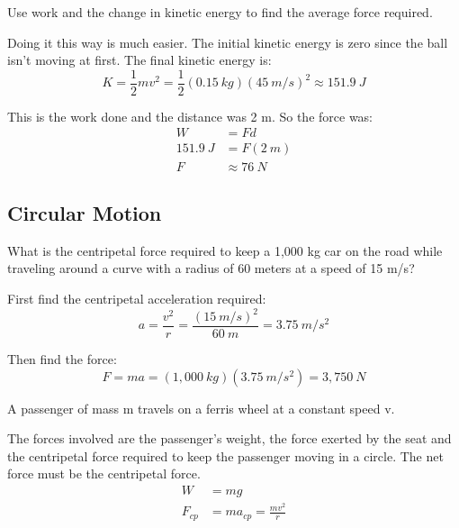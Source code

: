 \documentclass[fleqn,addpoints]{exam}
\begin{document}
\begin{questions}
\begin{parts}
\bonuspart[5]
Use work and the change in kinetic energy to find the average force required.
\begin{solution}
Doing it this way is much easier.  The initial kinetic energy is zero since the ball isn't moving at first.  The final
kinetic energy is:
\[
  K = \frac{1}{2} mv^2 = \frac{1}{2} (0.15 \ kg)(45 \ m/s)^2 \approx 151.9 \ J
\]

This is the work done and the distance was 2 m.  So the force was:
\begin{align*}
  W &= Fd \\
  151.9 \ J &= F (2 \ m) \\
  F &\approx 76 \ N
\end{align*}
 
\end{solution}
\end{parts}

\subsection{Circular Motion}

\question[5]
What is the centripetal force required to keep a 1,000 kg car on the road while traveling around a curve with
a radius of 60 meters at a speed of 15 m/s?

\begin{solution}
First find the centripetal acceleration required:
\[
  a = \frac{v^2}{r} = \frac{(15 \ m/s)^2}{60 \ m} = 3.75 \ m/s^2
\]

Then find the force:
\[
  F = ma = (1,000 \ kg)(3.75 \ m/s^2) = 3,750 \ N
\]

\end{solution}

\question
A passenger of mass m travels on a ferris wheel at a constant speed v.

\begin{solution}
  The forces involved are the passenger's weight, the force exerted by the seat and the centripetal force required to
  keep the passenger moving in a circle.  The net force must be the centripetal force.
\begin{align*}
  W &= mg \\
  F_{cp} &= m a_{cp} = \frac{mv^2}{r}
\end{align*}
\end{solution}

\end{questions}
\end{document}
